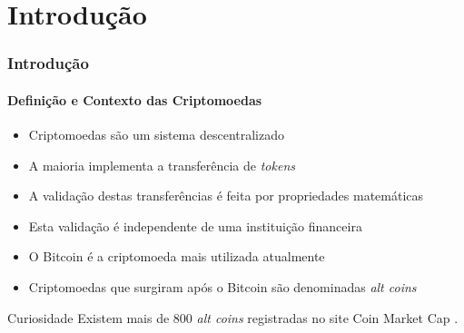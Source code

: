 \documentclass[aspectratio=43]{beamer}
\begin{document}
\section{Introdução}
\begin{frame}
\frametitle{Introdução}
\framesubtitle{Definição e Contexto das Criptomoedas}

\begin{itemize}
    \item Criptomoedas são um sistema descentralizado
        \cite{Prado2017}
    
    \item A maioria implementa a transferência de \emph{tokens}

    \item A validação destas transferências é feita por propriedades
        matemáticas \cite{LChicarino}

    \item Esta validação é independente de uma instituição financeira
        \cite{Nakamoto2008}

    \item O Bitcoin é a criptomoeda mais utilizada atualmente

    \item Criptomoedas que surgiram após o Bitcoin são denominadas
        \emph{alt coins}
\end{itemize}



\begin{block}{Curiosidade}
    Existem mais de $800$ \emph{alt coins} registradas no site Coin
    Market Cap \cite{Arsov, CoinMarketCap2018}.
\end{block}

\end{frame}
\end{document}
